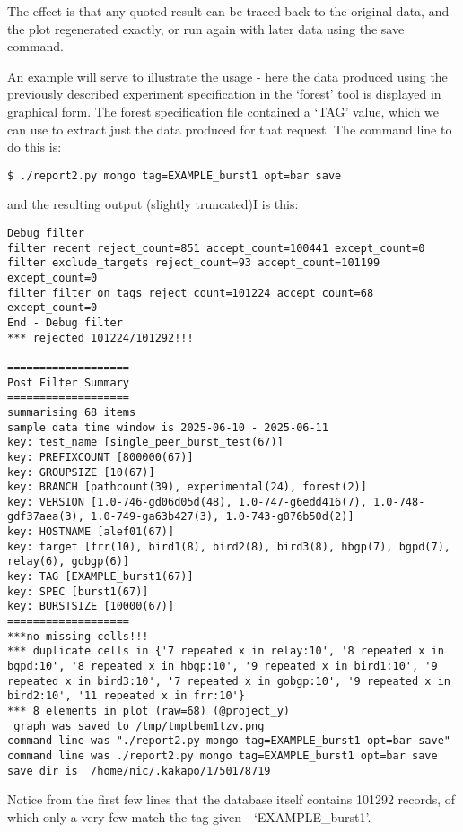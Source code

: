  The effect is that any quoted result can be traced back to the original data, and the plot regenerated exactly, or run again with later data using the save command.

 An example will serve to illustrate the usage - here the data produced using the previously described experiment specification in the `forest' tool is displayed in graphical form.
 The forest specification file contained a `TAG' value, which we can use to extract just the data produced for that request.  The command line to do this is:

\begin{lstlisting}
$ ./report2.py mongo tag=EXAMPLE_burst1 opt=bar save
\end{lstlisting}
 and the resulting output (slightly truncated)I is this:

\begin{lstlisting}
Debug filter
filter recent reject_count=851 accept_count=100441 except_count=0
filter exclude_targets reject_count=93 accept_count=101199 except_count=0
filter filter_on_tags reject_count=101224 accept_count=68 except_count=0
End - Debug filter
*** rejected 101224/101292!!!

===================
Post Filter Summary
===================
summarising 68 items
sample data time window is 2025-06-10 - 2025-06-11
key: test_name [single_peer_burst_test(67)]
key: PREFIXCOUNT [800000(67)]
key: GROUPSIZE [10(67)]
key: BRANCH [pathcount(39), experimental(24), forest(2)]
key: VERSION [1.0-746-gd06d05d(48), 1.0-747-g6edd416(7), 1.0-748-gdf37aea(3), 1.0-749-ga63b427(3), 1.0-743-g876b50d(2)]
key: HOSTNAME [alef01(67)]
key: target [frr(10), bird1(8), bird2(8), bird3(8), hbgp(7), bgpd(7), relay(6), gobgp(6)]
key: TAG [EXAMPLE_burst1(67)]
key: SPEC [burst1(67)]
key: BURSTSIZE [10000(67)]
===================
***no missing cells!!!
*** duplicate cells in {'7 repeated x in relay:10', '8 repeated x in bgpd:10', '8 repeated x in hbgp:10', '9 repeated x in bird1:10', '9 repeated x in bird3:10', '7 repeated x in gobgp:10', '9 repeated x in bird2:10', '11 repeated x in frr:10'}
*** 8 elements in plot (raw=68) (@project_y)
 graph was saved to /tmp/tmptbem1tzv.png
command line was "./report2.py mongo tag=EXAMPLE_burst1 opt=bar save"
command line was ./report2.py mongo tag=EXAMPLE_burst1 opt=bar save
save dir is  /home/nic/.kakapo/1750178719

\end{lstlisting}    

 Notice from the first few lines that the database itself contains 101292 records, of which only a very few match the tag given - `EXAMPLE_burst1'.

